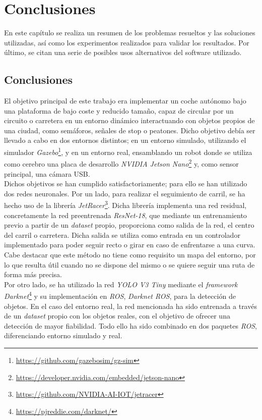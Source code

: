 \chapter{Conclusiones}
\label{cap:capitulo5}
En este capítulo se realiza un resumen de los problemas resueltos y las soluciones utilizadas, así como los experimentos realizados para validar los resultados. Por último, se citan una serie de posibles usos alternativos del software utilizado.

\section{Conclusiones}
\label{section:conclusiones}
El objetivo principal de este trabajo era implementar un coche autónomo bajo una plataforma de bajo coste y reducido tamaño, capaz de circular por un circuito o carretera en un entorno dinámico interactuando con objetos propios de una ciudad, como semáforos, señales de stop o peatones. Dicho objetivo debía ser llevado a cabo en dos entornos distintos; en un entorno simulado, utilizando el simulador \textit{Gazebo}\footnote{\url{https://github.com/gazebosim/gz-sim}}, y en un entorno real, ensamblando un robot donde se utiliza como cerebro una placa de desarrollo \textit{NVIDIA Jetson Nano}\footnote{\url{https://developer.nvidia.com/embedded/jetson-nano}} y, como sensor principal, una cámara USB.\\

Dichos objetivos se han cumplido satisfactoriamente; para ello se han utilizado dos redes neuronales. Por un lado, para realizar el seguimiento de carril, se ha hecho uso de la librería \textit{JetRacer}\footnote{\url{https://github.com/NVIDIA-AI-IOT/jetracer}}. Dicha librería implementa una red residual, concretamente la red preentrenada \textit{ResNet-18}, que mediante un entrenamiento previo a partir de un \textit{dataset} propio, proporciona como salida de la red, el centro del carril o carretera. Dicha salida se utiliza como entrada en un controlador implementado para poder seguir recto o girar en caso de enfrentarse a una curva. Cabe destacar que este método no tiene como requisito un mapa del entorno, por lo que resulta útil cuando no se dispone del mismo o se quiere seguir una ruta de forma más precisa.\\

Por otro lado, se ha utilizado la red \textit{YOLO V3 Tiny} mediante el \textit{framework} \textit{Darknet}\footnote{\url{https://pjreddie.com/darknet/}} y su implementación en \textit{ROS}, \textit{Darknet ROS}, para la detección de objetos. En el caso del entorno real, la red mencionada ha sido entrenada a través de un \textit{dataset} propio con los objetos reales, con el objetivo de ofrecer una detección de mayor fiabilidad. 
Todo ello ha sido combinado en dos paquetes \textit{ROS}, diferenciando entorno simulado y real.\\

